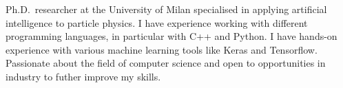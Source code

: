 

\begin{cvparagraph}

Ph.D.\ researcher at the University of Milan specialised in applying artificial intelligence to particle physics.
I have experience working with different programming languages, in particular with C++ and Python.
I have hands-on experience with various machine learning tools like Keras and Tensorflow.
Passionate about the field of computer science and open to opportunities in industry to futher improve my skills.
\end{cvparagraph}